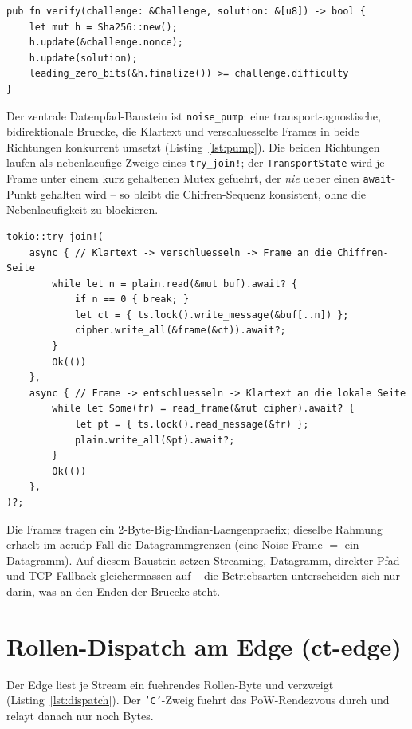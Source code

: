 \begin{lstlisting}[caption={Proof-of-Work: Pruefung der Loesung (vereinfacht).},label=lst:pow]
pub fn verify(challenge: &Challenge, solution: &[u8]) -> bool {
    let mut h = Sha256::new();
    h.update(&challenge.nonce);
    h.update(solution);
    leading_zero_bits(&h.finalize()) >= challenge.difficulty
}
\end{lstlisting}

Der zentrale Datenpfad-Baustein ist \texttt{noise\_pump}: eine
transport-agnostische, bidirektionale Bruecke, die Klartext und verschluesselte
Frames in beide Richtungen konkurrent umsetzt (Listing~\ref{lst:pump}). Die
beiden Richtungen laufen als nebenlaeufige Zweige eines \texttt{try\_join!}; der
\texttt{TransportState} wird je Frame unter einem kurz gehaltenen Mutex gefuehrt,
der \emph{nie} ueber einen \texttt{await}-Punkt gehalten wird -- so bleibt die
Chiffren-Sequenz konsistent, ohne die Nebenlaeufigkeit zu blockieren.

\begin{lstlisting}[caption={Bidirektionaler Noise-Pump (vereinfacht).},label=lst:pump]
tokio::try_join!(
    async { // Klartext -> verschluesseln -> Frame an die Chiffren-Seite
        while let n = plain.read(&mut buf).await? {
            if n == 0 { break; }
            let ct = { ts.lock().write_message(&buf[..n]) };
            cipher.write_all(&frame(&ct)).await?;
        }
        Ok(())
    },
    async { // Frame -> entschluesseln -> Klartext an die lokale Seite
        while let Some(fr) = read_frame(&mut cipher).await? {
            let pt = { ts.lock().read_message(&fr) };
            plain.write_all(&pt).await?;
        }
        Ok(())
    },
)?;
\end{lstlisting}

Die Frames tragen ein 2-Byte-Big-Endian-Laengenpraefix; dieselbe Rahmung erhaelt
im \gls{ac:udp}-Fall die Datagrammgrenzen (eine Noise-Frame $=$ ein Datagramm).
Auf diesem Baustein setzen Streaming, Datagramm, direkter Pfad und TCP-Fallback
gleichermassen auf -- die Betriebsarten unterscheiden sich nur darin, was an den
Enden der Bruecke steht.

\section{Rollen-Dispatch am Edge (ct-edge)}
\label{sec:impl-dispatch}

Der Edge liest je Stream ein fuehrendes Rollen-Byte und verzweigt
(Listing~\ref{lst:dispatch}). Der \texttt{'C'}-Zweig fuehrt das
PoW-Rendezvous durch und relayt danach nur noch Bytes.

